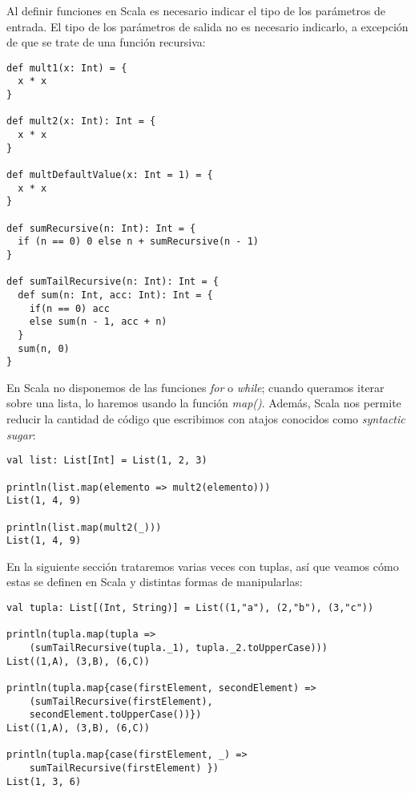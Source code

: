 Al definir funciones en Scala es necesario indicar el tipo de los parámetros de entrada. El tipo de los parámetros de salida no es necesario indicarlo, a excepción de que se trate de una función recursiva:\\

\begin{lstlisting}[frame=single]
def mult1(x: Int) = {
  x * x
}

def mult2(x: Int): Int = {
  x * x
}

def multDefaultValue(x: Int = 1) = {
  x * x
}

def sumRecursive(n: Int): Int = {
  if (n == 0) 0 else n + sumRecursive(n - 1)
}

def sumTailRecursive(n: Int): Int = {
  def sum(n: Int, acc: Int): Int = {
    if(n == 0) acc
    else sum(n - 1, acc + n)
  }
  sum(n, 0)
}
\end{lstlisting}

En Scala no disponemos de las funciones \textit{for} o \textit{while}; cuando queramos iterar sobre una lista, lo haremos usando la función \textit{map()}. Además, Scala nos permite reducir la cantidad de código que escribimos con atajos conocidos como \textit{syntactic sugar}:

\begin{lstlisting}[frame=single]
val list: List[Int] = List(1, 2, 3)

println(list.map(elemento => mult2(elemento)))
List(1, 4, 9)

println(list.map(mult2(_)))
List(1, 4, 9)
\end{lstlisting}

En la siguiente sección trataremos varias veces con tuplas, así que veamos cómo estas se definen en Scala y distintas formas de manipularlas:

\begin{lstlisting}[frame=single]
val tupla: List[(Int, String)] = List((1,"a"), (2,"b"), (3,"c"))

println(tupla.map(tupla => 
	(sumTailRecursive(tupla._1), tupla._2.toUpperCase)))
List((1,A), (3,B), (6,C))

println(tupla.map{case(firstElement, secondElement) => 
	(sumTailRecursive(firstElement), 
	secondElement.toUpperCase())})
List((1,A), (3,B), (6,C))

println(tupla.map{case(firstElement, _) => 
	sumTailRecursive(firstElement) })
List(1, 3, 6)

\end{lstlisting}


